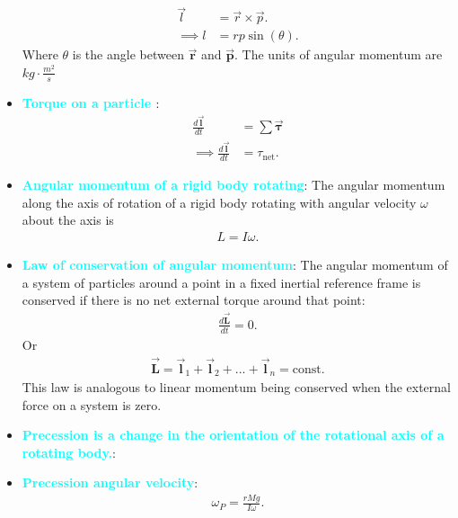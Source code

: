 \documentclass{report}
\begin{document}
\begin{itemize}
\begin{align*}
                \vec{l} &= \vec{r} \times \vec{p}. \\
                \implies  l &= rp\sin{\left(\theta \right)}
            .\end{align*}
            Where $\theta$ is the angle between $\vec{\mathbf{r}}$ and $\vec{\mathbf{p}}$. The units of angular momentum are $kg \cdot  \frac{m^{2}}{s} $
        \item \textbf{\textcolor{cyan}{Torque on a particle }}:
            \begin{align*}
                \frac{d\vec{\mathbf{l}}}{dt} &= \sum \vec{\mathbf{\tau}} \\
                \implies\frac{d\vec{\mathbf{l}}}{dt} &= \tau_{\text{net}}
            .\end{align*}
        \item \textbf{\textcolor{cyan}{Angular momentum of a rigid body rotating}}: The angular momentum along the axis of rotation of a rigid body rotating with angular velocity $\omega$ about the axis is
            \begin{align*}
                L = I\omega
            .\end{align*}
        \item \textbf{\textcolor{cyan}{Law of conservation of angular momentum}}:
            The angular momentum of a system of particles around a point in a fixed inertial reference frame is conserved if there is no net external torque around that point:
            \begin{align*}
                \frac{d\vec{\mathbf{L}}}{dt} = 0
            .\end{align*}
            Or
            \begin{align*}
             \vec{\mathbf{L}} = \vec{\mathbf{l}}_{1} + \vec{\mathbf{l}}_{2} + ... + \vec{\mathbf{l}}_{n} = \text{const}   
            .\end{align*}
            \bigbreak \noindent 
            This law is analogous to linear momentum being conserved when the external force on a system is zero.
    \item \textbf{\textcolor{cyan}{Precession is a change in the orientation of the rotational axis of a rotating body.}}:
    \item \textbf{\textcolor{cyan}{Precession angular velocity}}:
        \begin{align*}
            \omega_{P} = \frac{rMg}{I\omega}
        .\end{align*}
    \end{itemize}
\end{document}
